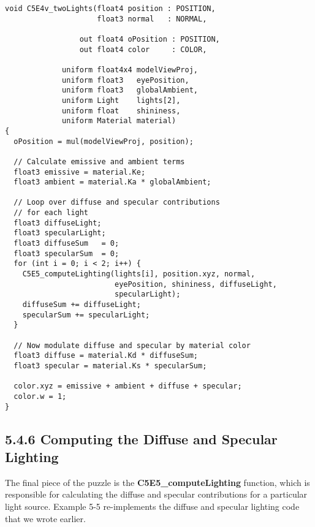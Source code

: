 \documentclass[../main.tex]{subfiles}
\begin{document}
\FloatBarrier
\begin{lstlisting}[caption=Example 5-4. The \textbf{C5E4v_twoLights} Vertex Program]
void C5E4v_twoLights(float4 position : POSITION,
                     float3 normal   : NORMAL,

                 out float4 oPosition : POSITION,
                 out float4 color     : COLOR,
             
             uniform float4x4 modelViewProj,
             uniform float3   eyePosition,
             uniform float3   globalAmbient,
             uniform Light    lights[2],
             uniform float    shininess,
             uniform Material material)
{
  oPosition = mul(modelViewProj, position);

  // Calculate emissive and ambient terms
  float3 emissive = material.Ke;
  float3 ambient = material.Ka * globalAmbient;

  // Loop over diffuse and specular contributions
  // for each light
  float3 diffuseLight;
  float3 specularLight;
  float3 diffuseSum   = 0;
  float3 specularSum  = 0;
  for (int i = 0; i < 2; i++) {
    C5E5_computeLighting(lights[i], position.xyz, normal,
                         eyePosition, shininess, diffuseLight,
                         specularLight);
    diffuseSum += diffuseLight;
    specularSum += specularLight;
  }

  // Now modulate diffuse and specular by material color
  float3 diffuse = material.Kd * diffuseSum;
  float3 specular = material.Ks * specularSum;

  color.xyz = emissive + ambient + diffuse + specular;
  color.w = 1;
}
\end{lstlisting}
\FloatBarrier

\subsection{5.4.6 Computing the Diffuse and Specular Lighting}

The final piece of the puzzle is the \textbf{C5E5_computeLighting} function, which is responsible for calculating the diffuse and specular contributions for a particular light source. Example 5-5 re-implements the diffuse and specular lighting code that we wrote earlier.
\end{document}
